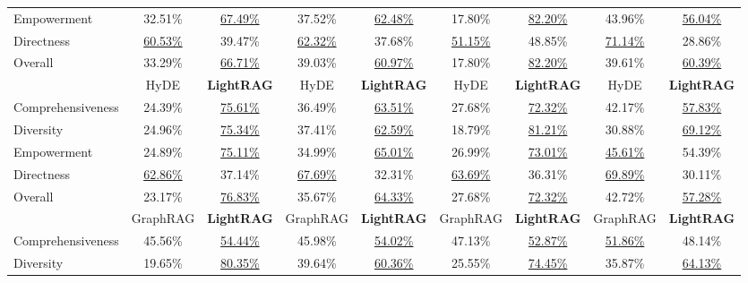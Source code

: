 \documentclass{article} %
\begin{document}
\begin{table}[h]
{\begin{tabular}{@{}lcccccccc@{}}
Empowerment            & 32.51\%      & \underline{67.49\%}     & 37.52\%      & \underline{62.48\%}     & 17.80\%      & \underline{82.20\%}     & 43.96\%      & \underline{56.04\%}     \\
Directness             & \underline{60.53\%}      & 39.47\%     & \underline{62.32\%}      & 37.68\%     & \underline{51.15\%}      & 48.85\%     & \underline{71.14\%}      & 28.86\%     \\
Overall         & 33.29\%      & \underline{66.71\%}     & 39.03\%      & \underline{60.97\%}     & 17.80\%      & \underline{82.20\%}     & 39.61\%      & \underline{60.39\%}     \\
\cmidrule(lr){2-3} \cmidrule(lr){4-5} \cmidrule(lr){6-7} \cmidrule(lr){8-9}
                      & HyDE & \textbf{LightRAG} & HyDE & \textbf{LightRAG} & HyDE & \textbf{LightRAG} & HyDE & \textbf{LightRAG} \\
\midrule
Comprehensiveness      & 24.39\%      & \underline{75.61\%}     & 36.49\%      & \underline{63.51\%}     & 27.68\%      & \underline{72.32\%}     & 42.17\%      & \underline{57.83\%}     \\
Diversity              & 24.96\%      & \underline{75.34\%}     & 37.41\%      & \underline{62.59\%}     & 18.79\%      & \underline{81.21\%}     & 30.88\%      & \underline{69.12\%}     \\
Empowerment            & 24.89\%      & \underline{75.11\%}     & 34.99\%      & \underline{65.01\%}     & 26.99\%      & \underline{73.01\%}     & \underline{45.61\%}      & 54.39\%     \\
Directness             & \underline{62.86\%}      & 37.14\%     & \underline{67.69\%}      & 32.31\%     & \underline{63.69\%}      & 36.31\%     & \underline{69.89\%}      & 30.11\%     \\
Overall         & 23.17\%      & \underline{76.83\%}     & 35.67\%      & \underline{64.33\%}     & 27.68\%      & \underline{72.32\%}     & 42.72\%      & \underline{57.28\%}     \\
\cmidrule(lr){2-3} \cmidrule(lr){4-5} \cmidrule(lr){6-7} \cmidrule(lr){8-9}
                      & GraphRAG & \textbf{LightRAG} & GraphRAG & \textbf{LightRAG} & GraphRAG & \textbf{LightRAG} & GraphRAG & \textbf{LightRAG} \\
\midrule
Comprehensiveness      & 45.56\%      & \underline{54.44\%}     & 45.98\%      & \underline{54.02\%}     &  47.13\%     & \underline{52.87\%}     & \underline{51.86\%}      & 48.14\%     \\
Diversity              & 19.65\%      & \underline{80.35\%}     & 39.64\%      & \underline{60.36\%}     &  25.55\%     & \underline{74.45\%}     & 35.87\%      & \underline{64.13\%}     \\

\end{tabular}}
\end{table}
\end{document}
